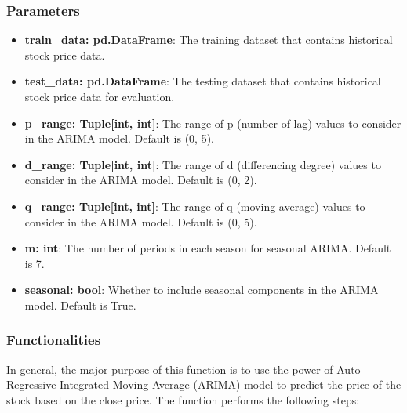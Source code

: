 \documentclass[11pt]{article}
\begin{document}
\subsubsection{Parameters}
\begin{itemize}
    \item \textbf{train\_data: pd.DataFrame}: The training dataset that contains historical stock price data.
    \item \textbf{test\_data: pd.DataFrame}: The testing dataset that contains historical stock price data for evaluation.
    \item \textbf{p\_range: Tuple[int, int]}: The range of p (number of lag) values to consider in the ARIMA model. Default is (0, 5).
    \item \textbf{d\_range: Tuple[int, int]}: The range of d (differencing degree) values to consider in the ARIMA model. Default is (0, 2).
    \item \textbf{q\_range: Tuple[int, int]}: The range of q (moving average) values to consider in the ARIMA model. Default is (0, 5).
    \item \textbf{m: int}: The number of periods in each season for seasonal ARIMA. Default is 7.
    \item \textbf{seasonal: bool}: Whether to include seasonal components in the ARIMA model. Default is True.
\end{itemize}

\subsubsection{Functionalities}
In general, the major purpose of this function is to use the power of Auto Regressive Integrated Moving Average (ARIMA) model to predict the price of the stock based on the close price. The function performs the following steps:
\end{document}
